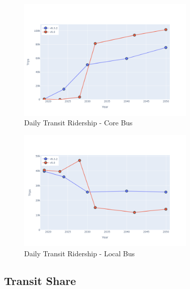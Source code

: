 \documentclass[
  letterpaper,
  DIV=11,
  numbers=noendperiod]{scrreprt}
\begin{document}
\begin{figure}[H]

{\centering \includegraphics[width=0.76\textwidth,height=\textheight]{v9x/v900/whats-new/_pictures/pdf-hy-tr-cor.png}

}

\caption{\label{fig-hy-tr-cor}Daily Transit Ridership - Core Bus}

\end{figure}

\begin{figure}[H]

{\centering \includegraphics[width=0.76\textwidth,height=\textheight]{v9x/v900/whats-new/_pictures/pdf-hy-tr-lcl.png}

}

\caption{\label{fig-pdf-hy-tr-lcl}Daily Transit Ridership - Local Bus}

\end{figure}

\hypertarget{transit-share}{%
\subsection{Transit Share}\label{transit-share}}
\end{document}
